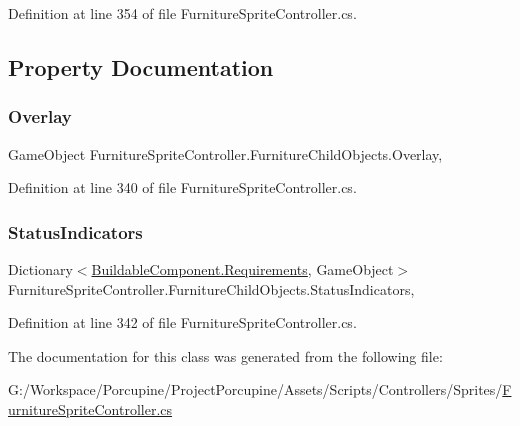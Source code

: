 Definition at line 354 of file Furniture\+Sprite\+Controller.\+cs.



\subsection{Property Documentation}
\mbox{\label{class_furniture_sprite_controller_1_1_furniture_child_objects_a0d56734a38a062719f146d12c97fd3c7}} 
\subsubsection{\texorpdfstring{Overlay}{Overlay}}
{\footnotesize\ttfamily Game\+Object Furniture\+Sprite\+Controller.\+Furniture\+Child\+Objects.\+Overlay\hspace{0.3cm}{\ttfamily [get]}, {\ttfamily [set]}}



Definition at line 340 of file Furniture\+Sprite\+Controller.\+cs.

\mbox{\label{class_furniture_sprite_controller_1_1_furniture_child_objects_ad856ffc9d40cb9c2f03d5195c6c2e55b}} 
\subsubsection{\texorpdfstring{Status\+Indicators}{StatusIndicators}}
{\footnotesize\ttfamily Dictionary$<$\hyperlink{class_project_porcupine_1_1_buildable_1_1_components_1_1_buildable_component_a331a0d67512b8b402c04c8cf31c0ca8a}{Buildable\+Component.\+Requirements}, Game\+Object$>$ Furniture\+Sprite\+Controller.\+Furniture\+Child\+Objects.\+Status\+Indicators\hspace{0.3cm}{\ttfamily [get]}, {\ttfamily [set]}}



Definition at line 342 of file Furniture\+Sprite\+Controller.\+cs.



The documentation for this class was generated from the following file\+:\begin{DoxyCompactItemize}
\item 
G\+:/\+Workspace/\+Porcupine/\+Project\+Porcupine/\+Assets/\+Scripts/\+Controllers/\+Sprites/\hyperlink{_furniture_sprite_controller_8cs}{Furniture\+Sprite\+Controller.\+cs}\end{DoxyCompactItemize}

